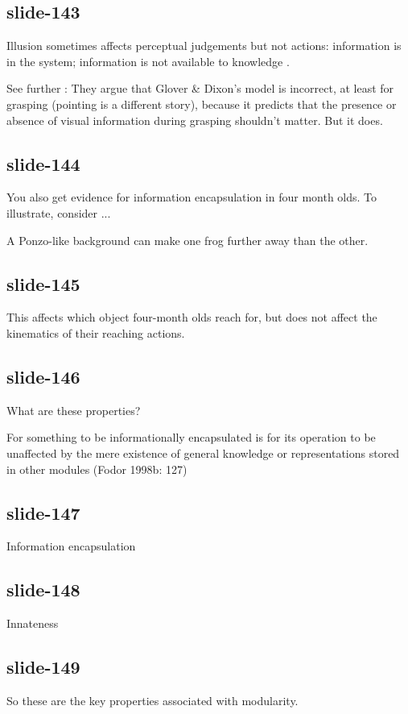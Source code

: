 \documentclass[12pt,\papersize]{extarticle}
\begin{document}
\subsection{slide-143}
Illusion sometimes affects perceptual judgements but not actions:
information is in the system;
information is not available to knowledge \citep{glover:2002_visual}.

See further \citet{bruno:2009_when}:
They argue that Glover \& Dixon's model \citep{glover:2002_dynamic} is
incorrect, at least for grasping (pointing is a different story), because
it predicts that the presence or absence of visual information during
grasping shouldn't matter. But it does.

\subsection{slide-144}
You also get evidence for information encapsulation in four month olds.
To illustrate, consider \citet{vanwermeskerken:2013_getting} ...

A Ponzo-like background can make one frog further away than the other.

\subsection{slide-145}
This affects which object four-month olds reach for,
but does not affect the kinematics of their reaching actions.

\subsection{slide-146}
What are these properties?

For something to be informationally encapsulated is for its operation to be unaffected by the mere existence of general knowledge or representations stored in other modules (Fodor 1998b: 127)

\subsection{slide-147}
Information encapsulation

\subsection{slide-148}
Innateness

\subsection{slide-149}
So these are the key properties associated with modularity.
\end{document}

